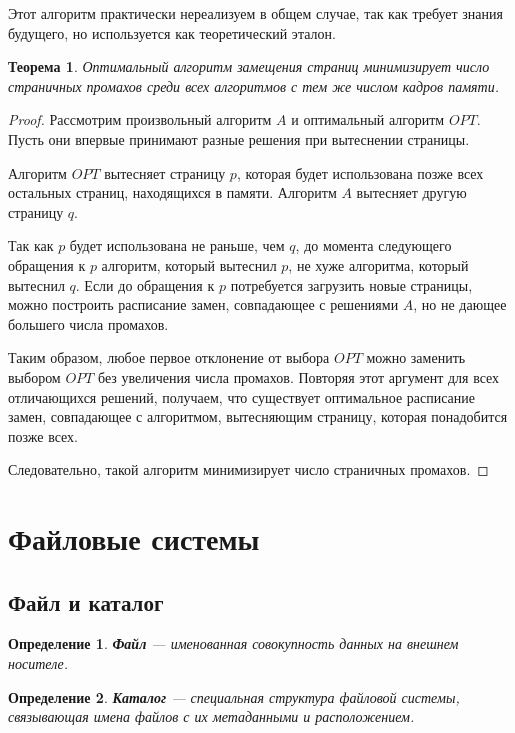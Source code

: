 \documentclass[12pt,a4paper]{article}
\newtheorem{definition}{Определение}
\newtheorem{theorem}{Теорема}
\begin{document}
Этот алгоритм практически нереализуем в общем случае, так как требует знания будущего, но используется как теоретический эталон.

\begin{theorem}
Оптимальный алгоритм замещения страниц минимизирует число страничных промахов среди всех алгоритмов с тем же числом кадров памяти.
\end{theorem}

\begin{proof}
Рассмотрим произвольный алгоритм $A$ и оптимальный алгоритм $OPT$. Пусть они впервые принимают разные решения при вытеснении страницы.

Алгоритм $OPT$ вытесняет страницу $p$, которая будет использована позже всех остальных страниц, находящихся в памяти. Алгоритм $A$ вытесняет другую страницу $q$.

Так как $p$ будет использована не раньше, чем $q$, до момента следующего обращения к $p$ алгоритм, который вытеснил $p$, не хуже алгоритма, который вытеснил $q$. Если до обращения к $p$ потребуется загрузить новые страницы, можно построить расписание замен, совпадающее с решениями $A$, но не дающее большего числа промахов.

Таким образом, любое первое отклонение от выбора $OPT$ можно заменить выбором $OPT$ без увеличения числа промахов. Повторяя этот аргумент для всех отличающихся решений, получаем, что существует оптимальное расписание замен, совпадающее с алгоритмом, вытесняющим страницу, которая понадобится позже всех.

Следовательно, такой алгоритм минимизирует число страничных промахов.
\end{proof}

\section{Файловые системы}

\subsection{Файл и каталог}

\begin{definition}
\textbf{Файл} --- именованная совокупность данных на внешнем носителе.
\end{definition}

\begin{definition}
\textbf{Каталог} --- специальная структура файловой системы, связывающая имена файлов с их метаданными и расположением.
\end{definition}
\end{document}
